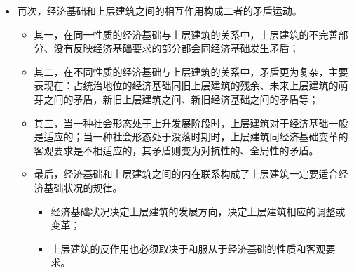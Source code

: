 \documentclass[12pt,openany]{ctexbook}
\begin{document}
\begin{itemize}
\begin{itemize}
\begin{itemize}
\begin{itemize}
\begin{itemize}
  \item 后果：当上层建筑为适合生产力发展要求的经济基础服务时，就成为推动社会发展的进步力量；当它为落后的经济基础服务时，就成为阻碍社会发展的消极力量。
\end{itemize}
  \item 再次，经济基础和上层建筑之间的相互作用构成二者的矛盾运动。
\begin{itemize}
  \item 其一，在同一性质的经济基础与上层建筑的关系中，上层建筑的不完善部分、没有反映经济基础要求的部分都会同经济基础发生矛盾；
  \item 其二，在不同性质的经济基础与上层建筑的关系中，矛盾更为复杂，主要表现在：占统治地位的经济基础同旧上层建筑的残余、未来上层建筑的萌芽之间的矛盾，新旧上层建筑之间、新旧经济基础之间的矛盾等；
  \item 其三，当一种社会形态处于上升发展阶段时，上层建筑对于经济基础一般是适应的；当一种社会形态处于没落时期时，上层建筑同经济基础变革的客观要求是不相适应的，其矛盾则变为对抗性的、全局性的矛盾。
  \item 最后，经济基础和上层建筑之间的内在联系构成了上层建筑一定要适合经济基础状况的规律。
\begin{itemize}
  \item 经济基础状况决定上层建筑的发展方向，决定上层建筑相应的调整或变革；
  \item 上层建筑的反作用也必须取决于和服从于经济基础的性质和客观要求。
\end{itemize}
\end{itemize}
\end{itemize}
\end{itemize}
\end{itemize}
\end{itemize}
\end{document}
